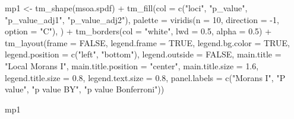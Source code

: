 \documentclass[
  letterpaper,
]{scrbook}
\newenvironment{Shaded}{\begin{snugshade}}{\end{snugshade}}
\newcommand{\AttributeTok}[1]{\textcolor[rgb]{0.40,0.45,0.13}{#1}}
\newcommand{\ConstantTok}[1]{\textcolor[rgb]{0.56,0.35,0.01}{#1}}
\newcommand{\DecValTok}[1]{\textcolor[rgb]{0.68,0.00,0.00}{#1}}
\newcommand{\FloatTok}[1]{\textcolor[rgb]{0.68,0.00,0.00}{#1}}
\newcommand{\FunctionTok}[1]{\textcolor[rgb]{0.28,0.35,0.67}{#1}}
\newcommand{\NormalTok}[1]{\textcolor[rgb]{0.00,0.23,0.31}{#1}}
\newcommand{\OtherTok}[1]{\textcolor[rgb]{0.00,0.23,0.31}{#1}}
\newcommand{\SpecialCharTok}[1]{\textcolor[rgb]{0.37,0.37,0.37}{#1}}
\newcommand{\StringTok}[1]{\textcolor[rgb]{0.13,0.47,0.30}{#1}}
\begin{document}
\begin{Shaded}
\begin{Highlighting}[]
\NormalTok{mp1 }\OtherTok{\textless{}{-}}  \FunctionTok{tm\_shape}\NormalTok{(msoa.spdf) }\SpecialCharTok{+} 
  \FunctionTok{tm\_fill}\NormalTok{(}\AttributeTok{col =} \FunctionTok{c}\NormalTok{(}\StringTok{"loci"}\NormalTok{, }\StringTok{"p\_value"}\NormalTok{, }\StringTok{"p\_value\_adj1"}\NormalTok{, }\StringTok{"p\_value\_adj2"}\NormalTok{),}
          \AttributeTok{palette =} \FunctionTok{viridis}\NormalTok{(}\AttributeTok{n =} \DecValTok{10}\NormalTok{, }\AttributeTok{direction =} \SpecialCharTok{{-}}\DecValTok{1}\NormalTok{, }\AttributeTok{option =} \StringTok{"C"}\NormalTok{),}
\NormalTok{          ) }\SpecialCharTok{+}
  \FunctionTok{tm\_borders}\NormalTok{(}\AttributeTok{col =} \StringTok{"white"}\NormalTok{, }\AttributeTok{lwd =} \FloatTok{0.5}\NormalTok{, }\AttributeTok{alpha =} \FloatTok{0.5}\NormalTok{) }\SpecialCharTok{+}
  \FunctionTok{tm\_layout}\NormalTok{(}\AttributeTok{frame =} \ConstantTok{FALSE}\NormalTok{,}
            \AttributeTok{legend.frame =} \ConstantTok{TRUE}\NormalTok{, }\AttributeTok{legend.bg.color =} \ConstantTok{TRUE}\NormalTok{,}
            \AttributeTok{legend.position =} \FunctionTok{c}\NormalTok{(}\StringTok{"left"}\NormalTok{, }\StringTok{"bottom"}\NormalTok{),}
            \AttributeTok{legend.outside =} \ConstantTok{FALSE}\NormalTok{,}
            \AttributeTok{main.title =} \StringTok{"Local Morans I"}\NormalTok{, }
            \AttributeTok{main.title.position =} \StringTok{"center"}\NormalTok{,}
            \AttributeTok{main.title.size =} \FloatTok{1.6}\NormalTok{,}
            \AttributeTok{legend.title.size =} \FloatTok{0.8}\NormalTok{,}
            \AttributeTok{legend.text.size =} \FloatTok{0.8}\NormalTok{,}
            \AttributeTok{panel.labels =} \FunctionTok{c}\NormalTok{(}\StringTok{"Morans I"}\NormalTok{,}
                               \StringTok{"P value"}\NormalTok{,}
                               \StringTok{"p value BY"}\NormalTok{,}
                             \StringTok{"p value Bonferroni"}\NormalTok{))}

\NormalTok{mp1}
\end{Highlighting}
\end{Shaded}
\end{document}
